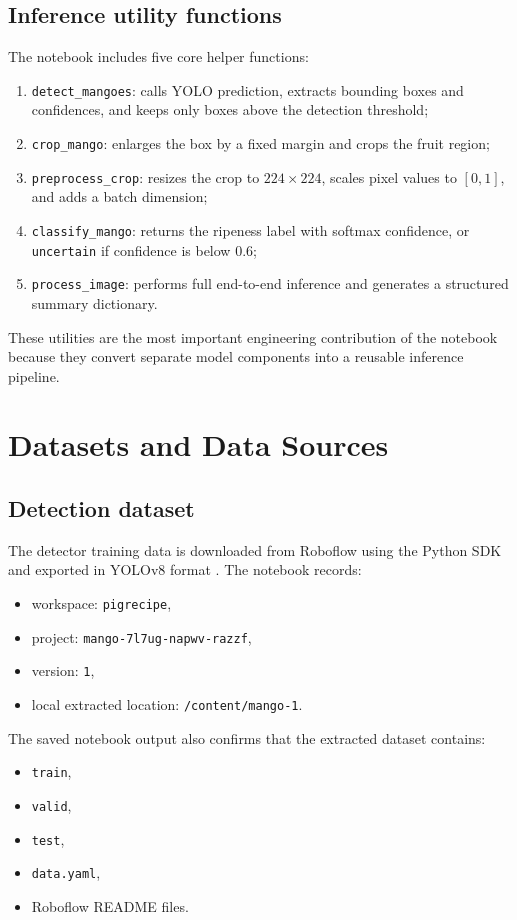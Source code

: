 \documentclass[12pt,a4paper]{article}
\begin{document}
\subsection{Inference utility functions}
The notebook includes five core helper functions:
\begin{enumerate}
    \item \texttt{detect\_mangoes}: calls YOLO prediction, extracts bounding boxes and confidences, and keeps only boxes above the detection threshold;
    \item \texttt{crop\_mango}: enlarges the box by a fixed margin and crops the fruit region;
    \item \texttt{preprocess\_crop}: resizes the crop to \(224 \times 224\), scales pixel values to \([0,1]\), and adds a batch dimension;
    \item \texttt{classify\_mango}: returns the ripeness label with softmax confidence, or \texttt{uncertain} if confidence is below 0.6;
    \item \texttt{process\_image}: performs full end-to-end inference and generates a structured summary dictionary.
\end{enumerate}

These utilities are the most important engineering contribution of the notebook because they convert separate model components into a reusable inference pipeline.

\section{Datasets and Data Sources}
\subsection{Detection dataset}
The detector training data is downloaded from Roboflow using the Python SDK and exported in YOLOv8 format \cite{roboflowsdk,roboflowdataset}. The notebook records:
\begin{itemize}
    \item workspace: \texttt{pigrecipe},
    \item project: \texttt{mango-7l7ug-napwv-razzf},
    \item version: \texttt{1},
    \item local extracted location: \texttt{/content/mango-1}.
\end{itemize}

The saved notebook output also confirms that the extracted dataset contains:
\begin{itemize}
    \item \texttt{train},
    \item \texttt{valid},
    \item \texttt{test},
    \item \texttt{data.yaml},
    \item Roboflow README files.
\end{itemize}
\end{document}
